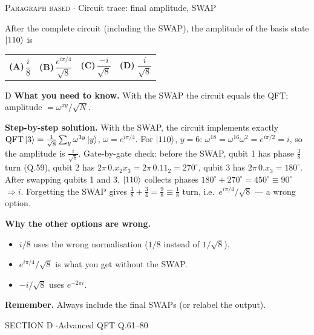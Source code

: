 \documentclass[11pt,a4paper]{article}
\newcommand{\optlabel}[1]{\textbf{(#1)}}
\newcommand{\correctlabel}[1]{\textcolor{okgreen}{\textbf{(#1)}\,\ding{51}}}
\newenvironment{qitem}[1]{\begin{list}{}{\setlength{\leftmargin}{3.3em}\setlength{\labelwidth}{3.1em}%
  \setlength{\labelsep}{0.2em}\setlength{\topsep}{3pt}\setlength{\parsep}{3pt}}\item[\textbf{Q.#1}\hfill]}{\end{list}}
\newcommand{\qsep}{\par\vspace{2pt}{\color{black!15}\hrule}\vspace{4pt}}
\newcommand{\qmeta}[2]{{\footnotesize\color{black!60}\textsc{#1} \;$\cdot$\; #2}\par}
\begin{document}
\begin{qitem}{60}
\qmeta{Paragraph based}{Circuit trace: final amplitude, SWAP}
After the complete circuit (including the SWAP), the amplitude of the basis state $\ket{110}$ is
\par\smallskip\noindent\begin{tabularx}{\linewidth}{@{}*{4}{L}@{}}
\optlabel{A}\,$\dfrac{i}{8}$ & \optlabel{B}\,$\dfrac{e^{i\pi/4}}{\sqrt8}$ & \optlabel{C}\,$\dfrac{-i}{\sqrt8}$ & \correctlabel{D}\,$\dfrac{i}{\sqrt8}$
\end{tabularx}
\end{qitem}
\begin{solbox}{D}
\textbf{\color{brand}What you need to know.} With the SWAP the circuit equals the QFT; amplitude $= \omega^{xy}/\sqrt N$.

\textbf{\color{brand}Step-by-step solution.} With the SWAP, the circuit implements exactly $\mathrm{QFT}\ket{3} = \frac{1}{\sqrt8}\sum_y\omega^{3y}\ket y$, $\omega = e^{i\pi/4}$.
For $\ket{110}$, $y = 6$: $\omega^{18} = \omega^{16}\omega^{2} = e^{i\pi/2} = i$, so the amplitude is $\frac{i}{\sqrt8}$.
Gate-by-gate check: before the SWAP, qubit 1 has phase $\frac38$ turn (Q.59), qubit 2 has $2\pi\,0.x_2x_3 = 2\pi\,0.11_2 = 270^\circ$,
qubit 3 has $2\pi\,0.x_3 = 180^\circ$. After swapping qubits 1 and 3, $\ket{110}$ collects phases $180^\circ + 270^\circ = 450^\circ \equiv 90^\circ$
$\Rightarrow i$. Forgetting the SWAP gives $\frac38 + \frac34 = \frac98 \equiv \frac18$ turn, i.e.\ $e^{i\pi/4}/\sqrt8$ --- a wrong option.

\textbf{\color{brand}Why the other options are wrong.}
\begin{itemize}[leftmargin=2.4em, itemsep=1pt, topsep=2pt]
\item[\textbf{(A)}] $i/8$ uses the wrong normalisation ($1/8$ instead of $1/\sqrt8$).
\item[\textbf{(B)}] $e^{i\pi/4}/\sqrt8$ is what you get without the SWAP.
\item[\textbf{(C)}] $-i/\sqrt8$ uses $e^{-2\pi i}$.
\end{itemize}
\textbf{\color{brand}Remember.} Always include the final SWAPs (or relabel the output).
\end{solbox}
\qsep

\newpage

\begin{sectionbanner}SECTION D \enspace$\cdot$\enspace Advanced QFT \hfill Q.61--80\end{sectionbanner}
\end{document}
